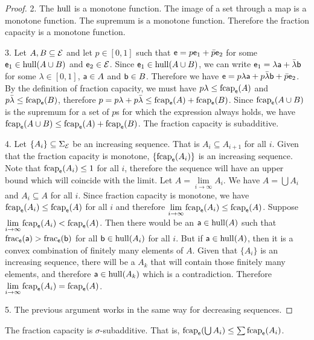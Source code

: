 \begin{mathSection}
\begin{proof}
		2. The $\hull$ is a monotone function. The image of a set through a map is a monotone function. The supremum is a monotone function. Therefore the fraction capacity is a monotone function.
		
		3. Let $A, B \subseteq \Ens$ and let $p \in [0,1]$ such that $\ens = p \ens_1 + \bar{p} \ens_2$ for some $\ens_1 \in \hull(A \cup B)$ and $\ens_2 \in \Ens$. Since $\ens_1 \in \hull(A \cup B)$, we can write $\ens_1 = \lambda \ens[a] + \bar{\lambda} \ens[b]$ for some $\lambda \in [0,1]$, $\ens[a] \in A$ and $\ens[b] \in B$. Therefore we have $\ens = p \lambda \ens[a] + p \bar{\lambda} \ens[b] + \bar{p} \ens_2$. By the definition of fraction capacity, we must have $p\lambda \leq \fcap_{\ens}(A)$ and $p\bar{\lambda} \leq \fcap_{\ens}(B)$, therefore $p = p\lambda + p\bar{\lambda} \leq \fcap_{\ens}(A) + \fcap_{\ens}(B)$. 	Since $\fcap_{\ens}(A \cup B)$ is the supremum for a set of $p$s for which the expression always holds, we have $\fcap_{\ens}(A \cup B) \leq \fcap_{\ens}(A) + \fcap_{\ens}(B)$. The fraction capacity is subadditive.
		
		4. Let $\{A_i\} \subseteq \Sigma_{\Ens}$ be an increasing sequence. That is $A_i \subseteq A_{i+1}$ for all $i$. Given that the fraction capacity is monotone, $\{\fcap_{\ens}(A_i)\}$ is an increasing sequence. Note that $\fcap_{\ens}(A_i) \leq 1$ for all $i$, therefore the sequence will have an upper bound which will coincide with the limit. Let $A = \lim\limits_{i \to \infty} A_i$. We have $A = \bigcup A_i$ and $A_i \subseteq A$ for all $i$. Since fraction capacity is monotone, we have $\fcap_{\ens}(A_i) \leq \fcap_{\ens}(A)$ for all $i$ and therefore $\lim\limits_{i \to \infty} \fcap_{\ens}(A_i) \leq \fcap_{\ens}(A)$. Suppose $\lim\limits_{i \to \infty} \fcap_{\ens}(A_i) < \fcap_{\ens}(A)$. Then there would be an $\ens[a] \in \hull(A)$ such that $\size_{\ens}(\ens[a]) > \size_{\ens}(\ens[b])$ for all $\ens[b] \in \hull(A_i)$ for all $i$. But if $\ens[a] \in \hull(A)$, then it is a convex combination of finitely many elements of $A$. Given that $\{A_i\}$ is an increasing sequence, there will be a $A_k$ that will contain those finitely many elements, and therefore $\ens[a] \in \hull(A_k)$ which is a contradiction. Therefore $\lim\limits_{i \to \infty} \fcap_{\ens}(A_i) = \fcap_{\ens}(A)$.
		
		5. The previous argument works in the same way for decreasing sequences.
	\end{proof}
\end{mathSection}

\begin{conj}
	The fraction capacity is $\sigma$-subadditive. That is, $\fcap_{\ens}(\bigcup A_i) \leq \sum \fcap_{\ens}(A_i)$.
\end{conj}

